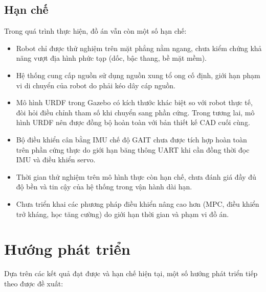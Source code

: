 \subsection{Hạn chế}

Trong quá trình thực hiện, đồ án vẫn còn một số hạn chế:

\begin{itemize}
    \item Robot chỉ được thử nghiệm trên mặt phẳng nằm ngang, chưa kiểm chứng khả năng vượt địa hình phức tạp (dốc, bậc thang, bề mặt mềm).
    \item Hệ thống cung cấp nguồn sử dụng nguồn xung tổ ong cố định, giới hạn phạm vi di chuyển của robot do phải kéo dây cáp nguồn.
    \item Mô hình URDF trong Gazebo có kích thước khác biệt so với robot thực tế, đòi hỏi điều chỉnh tham số khi chuyển sang phần cứng. Trong tương lai, mô hình URDF nên được đồng bộ hoàn toàn với bản thiết kế CAD cuối cùng.
    \item Bộ điều khiển cân bằng IMU chế độ GAIT chưa được tích hợp hoàn toàn trên phần cứng thực do giới hạn băng thông UART khi cần đồng thời đọc IMU và điều khiển servo.
    \item Thời gian thử nghiệm trên mô hình thực còn hạn chế, chưa đánh giá đầy đủ độ bền và tin cậy của hệ thống trong vận hành dài hạn.
    \item Chưa triển khai các phương pháp điều khiển nâng cao hơn (MPC, điều khiển trở kháng, học tăng cường) do giới hạn thời gian và phạm vi đồ án.
\end{itemize}

\section{Hướng phát triển}

Dựa trên các kết quả đạt được và hạn chế hiện tại, một số hướng phát triển tiếp theo được đề xuất:

